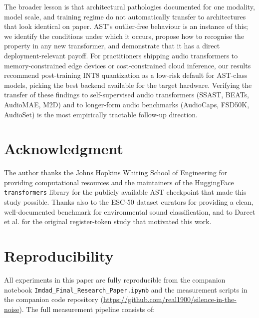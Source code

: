 \documentclass[conference]{IEEEtran}
\begin{document}
The broader lesson is that architectural pathologies documented for one modality, model scale, and training regime do not automatically transfer to architectures that look identical on paper. AST's outlier-free behaviour is an instance of this; we identify the conditions under which it occurs, propose how to recognise the property in any new transformer, and demonstrate that it has a direct deployment-relevant payoff. For practitioners shipping audio transformers to memory-constrained edge devices or cost-constrained cloud inference, our results recommend post-training INT8 quantization as a low-risk default for AST-class models, picking the best backend available for the target hardware. Verifying the transfer of these findings to self-supervised audio transformers (SSAST, BEATs, AudioMAE, M2D) and to longer-form audio benchmarks (AudioCaps, FSD50K, AudioSet) is the most empirically tractable follow-up direction.

\section*{Acknowledgment}

The author thanks the Johns Hopkins Whiting School of Engineering for providing computational resources and the maintainers of the HuggingFace \texttt{transformers} library for the publicly available AST checkpoint that made this study possible. Thanks also to the ESC-50 dataset curators for providing a clean, well-documented benchmark for environmental sound classification, and to Darcet et al. for the original register-token study that motivated this work.

\section*{Reproducibility}

All experiments in this paper are fully reproducible from the companion notebook \texttt{Imdad\_Final\_Research\_Paper.ipynb} and the measurement scripts in the companion code repository (\url{https://github.com/real1900/silence-in-the-noise}). The full measurement pipeline consists of:
\end{document}
